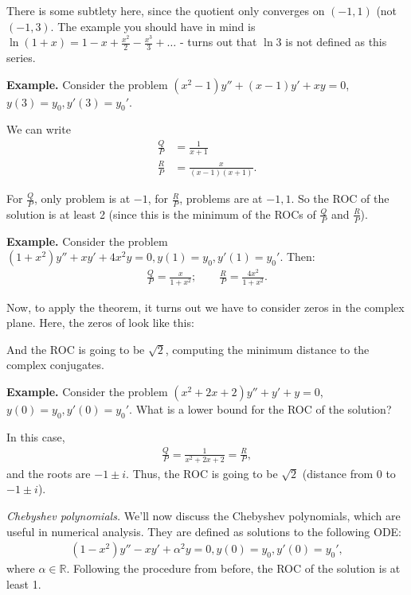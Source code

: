 \documentclass{article}
\newcommand{\RR}{\mathbb{R}}
\begin{document}
There is some subtlety here, since the quotient only converges on $(-1, 1)$ (not $(-1, 3)$.  The example you should have in mind is $\ln(1+x) = 1 - x + \frac{x^2}{2} - \frac{x^3}{3} + \dots $ - turns out that $\ln 3$ is not defined as this series.

  {\bf Example.} Consider the problem $(x^2-1) y'' + (x-1) y' + xy = 0$, $y(3) = y_0, y'(3) = y_0'$.

  We can write
  \begin{align*}
    \frac{Q}{P} &= \frac{1}{x+1} \\
    \frac{R}{P} &= \frac{x}{(x-1)(x+1)}.
  \end{align*}

  For $\frac{Q}{P}$, only problem is at $-1$, for $\frac{R}{P}$, problems are at $-1, 1$.  So the ROC of the solution is at least 2 (since this is the minimum of the ROCs of $\frac{Q}{P}$ and $\frac{R}{P}$).

  {\bf Example.} Consider the problem $(1+x^2) y'' + xy' + 4x^2 y = 0, y(1) = y_0, y'(1) = y_0' $.  Then:
  \begin{align*}
    \frac{Q}{P} = \frac{x}{1+x^2}; \qquad \frac{R}{P} = \frac{4x^2}{1+x^2}.
  \end{align*}

  Now, to apply the theorem, it turns out we have to consider zeros in the complex plane.  Here, the zeros of look like this:


And the ROC is going to be $\sqrt{2}$, computing the minimum distance to the complex conjugates.

{\bf Example.} Consider the problem $(x^2 + 2x + 2) y'' + y' + y = 0$, $y(0) = y_0, y'(0) = y_0'$.  What is a lower bound for the ROC of the solution?


In this case, 
\begin{align*}
  \frac{Q}{P} = \frac{1}{x^2 + 2x+2} = \frac{R}{P},
\end{align*}
and the roots are  $-1 \pm i$.  Thus, the ROC is going to be $\sqrt{2}$ (distance from 0 to $-1 \pm i$).

{\it Chebyshev polynomials.} We'll now discuss the Chebyshev polynomials, which are useful in numerical analysis.  They are defined as solutions to the following ODE:
\begin{align*}
  (1 - x^2) y'' - xy' + \alpha^2 y = 0, y(0) = y_0, y'(0) = y_0',
\end{align*}
where $\alpha \in \RR$.  Following the procedure from before, the ROC of the solution is at least 1.
\end{document}
